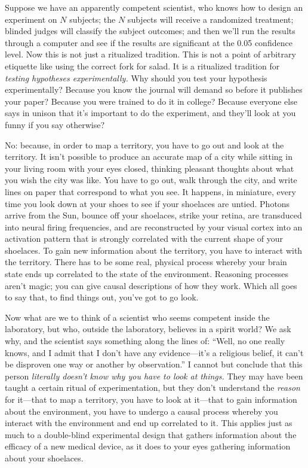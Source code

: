 {
 Suppose we have an apparently competent scientist, who knows how
to design an experiment on $N$ subjects; the $N$ subjects will receive a
randomized treatment; blinded judges will classify the subject
outcomes; and then we'll run the results through a
computer and see if the results are significant at the 0.05 confidence
level. Now this is not just a ritualized tradition. This is not a point
of arbitrary etiquette like using the correct fork for salad. It is a
ritualized tradition for \textit{testing hypotheses experimentally.}
Why should you test your hypothesis experimentally? Because you know
the journal will demand so before it publishes your paper? Because you
were trained to do it in college? Because everyone else says in unison
that it's important to do the experiment, and
they'll look at you funny if you say otherwise?}

{
 No: because, in order to map a territory, you have to go out and
look at the territory. It isn't possible to produce an
accurate map of a city while sitting in your living room with your eyes
closed, thinking pleasant thoughts about what you wish the city was
like. You have to go out, walk through the city, and write lines on
paper that correspond to what you see. It happens, in miniature, every
time you look down at your shoes to see if your shoelaces are untied.
Photons arrive from the Sun, bounce off your shoelaces, strike your
retina, are transduced into neural firing frequencies, and are
reconstructed by your visual cortex into an activation pattern that is
strongly correlated with the current shape of your shoelaces. To gain
new information about the territory, you have to interact with the
territory. There has to be some real, physical process whereby your
brain state ends up correlated to the state of the environment.
Reasoning processes aren't magic; you can give causal
descriptions of how they work. Which all goes to say that, to find
things out, you've got to go look.}

{
 Now what are we to think of a scientist who seems competent inside
the laboratory, but who, outside the laboratory, believes in a spirit
world? We ask why, and the scientist says something along the lines of:
``Well, no one really knows, and I admit that I
don't have any evidence---it's a
religious belief, it can't be disproven one way or
another by observation.'' I cannot but conclude that
this person \textit{literally doesn't know why you have
to look at things.} They may have been taught a certain ritual of
experimentation, but they don't understand the
\textit{reason} for it---that to map a territory, you have to look at
it---that to gain information about the environment, you have to
undergo a causal process whereby you interact with the environment and
end up correlated to it. This applies just as much to a double-blind
experimental design that gathers information about the efficacy of a
new medical device, as it does to your eyes gathering information about
your shoelaces.}

